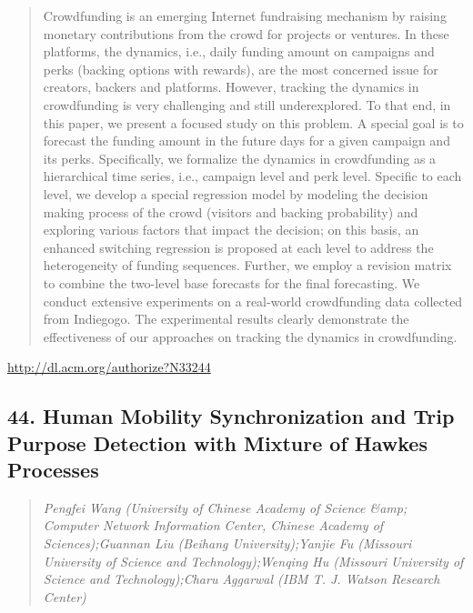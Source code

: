 \documentclass{article}
\begin{document}
\begin{quote}
Crowdfunding is an emerging Internet fundraising mechanism by raising monetary contributions from the crowd for projects or ventures. In these platforms, the dynamics, i.e., daily funding amount on campaigns and perks (backing options with rewards), are the most concerned issue for creators, backers and platforms. However, tracking the dynamics in crowdfunding is very challenging and still underexplored. To that end, in this paper, we present a focused study on this problem. A special goal is to forecast the funding amount in the future days for a given campaign and its perks. Specifically, we formalize the dynamics in crowdfunding as a hierarchical time series, i.e., campaign level and perk level. Specific to each level, we develop a special regression model by modeling the decision making process of the crowd (visitors and backing probability) and exploring various factors that impact the decision; on this basis, an enhanced switching regression is proposed at each level to address the heterogeneity of funding sequences. Further, we employ a revision matrix to combine the two-level base forecasts for the final forecasting. We conduct extensive experiments on a real-world crowdfunding data collected from Indiegogo. The experimental results clearly demonstrate the effectiveness of our approaches on tracking the dynamics in crowdfunding.
\end{quote}

\href{http://dl.acm.org/authorize?N33244}{http://dl.acm.org/authorize?N33244}

\subsection{44. Human Mobility Synchronization and Trip Purpose Detection with Mixture of Hawkes Processes}

\begin{quote}
\footnotesize{\textit{Pengfei Wang (University of Chinese Academy of Science \&amp; Computer Network Information Center, Chinese Academy of Sciences);Guannan Liu (Beihang University);Yanjie Fu (Missouri University of Science and Technology);Wenqing Hu (Missouri University of Science and Technology);Charu Aggarwal (IBM T. J. Watson Research Center)}}

\end{quote}
\end{document}
